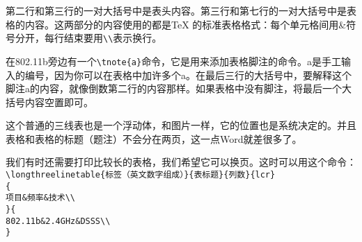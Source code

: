 第二行和第三行的一对大括号中是表头内容。第三行和第七行的一对大括号中是表格的内容。这两部分的内容使用的都是TeX 的标准表格格式：每个单元格间用\&符号分开，每行结束要用\verb|\\|表示换行。

在802.11b旁边有一个\verb|\tnote{a}|命令，它是用来添加表格脚注的命令。a是手工输入的编号，因为你可以在表格中加许多个a。在最后三行的大括号中，要解释这个脚注a的内容，就像倒数第二行的内容那样。如果表格中没有脚注，将最后一个大括号内容空置即可。

这个普通的三线表也是一个浮动体，和图片一样，它的位置也是系统决定的。并且表格和表格的标题（题注）不会分在两页，这一点Word就差很多了。

我们有时还需要打印比较长的表格，我们希望它可以换页。这时可以用这个命令：\\
\verb|\longthreelinetable{标签（英文数字组成）}{表标题}{列数}{lcr}|\\
\verb|{|\\
\verb|项目&频率&技术\\|\\
\verb|}{|\\
\verb|802.11b&2.4GHz&DSSS\\|\\
\verb|}|\par
{}
